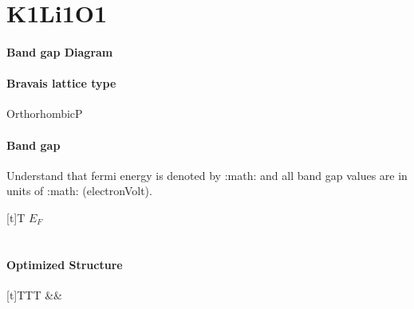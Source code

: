 \documentclass[letterpaper,10pt,english]{sphinxmanual}
\begin{document}
\chapter{K1Li1O1}
\label{\detokenize{K1Li1O1/K1Li1O1:k1li1o1}}\label{\detokenize{K1Li1O1/K1Li1O1::doc}}\subsubsection*{Band gap Diagram}

\noindent{}
\subsubsection*{Bravais lattice type}

\sphinxAtStartPar
OrthorhombicP
\subsubsection*{Band gap}

\sphinxAtStartPar
Understand that fermi energy is denoted by :math: and all band gap values are in units of :math: (electron\sphinxhyphen{}Volt).


\begin{savenotes}\sphinxattablestart
\sphinxthistablewithglobalstyle
\centering
\begin{tabulary}{\linewidth}[t]{T}
\sphinxtoprule
\sphinxstyletheadfamily 
\sphinxAtStartPar
\(E_F\)
\\
\sphinxmidrule
\sphinxtableatstartofbodyhook
{}
\\
\sphinxbottomrule
\end{tabulary}
\sphinxtableafterendhook\par
\sphinxattableend\end{savenotes}
\subsubsection*{Optimized Structure}
\begin{description}

\begin{savenotes}\sphinxattablestart
\sphinxthistablewithglobalstyle
\centering
\begin{tabulary}{\linewidth}[t]{TTT}
\sphinxtoprule
\sphinxtableatstartofbodyhook&&\\
\sphinxbottomrule
\end{tabulary}
\sphinxtableafterendhook\par
\sphinxattableend\end{savenotes}

\end{description}
\end{document}
